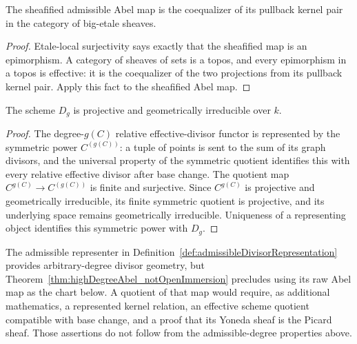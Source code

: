\begin{theorem}
  \label{thm:admissibleAbel_etaleCoequalizer}
  \leanok
  The sheafified admissible Abel map is the coequalizer of its pullback kernel pair in the
  category of big-etale sheaves.
\end{theorem}
\begin{proof}
  Etale-local surjectivity says exactly that the sheafified map is an epimorphism.  A category
  of sheaves of sets is a topos, and every epimorphism in a topos is effective: it is the
  coequalizer of the two projections from its pullback kernel pair.  Apply this fact to the
  sheafified Abel map.
\end{proof}

\begin{theorem}
  \label{thm:genusDivisorSource_geometry}
  \notready
  The scheme \(D_g\) is projective and geometrically irreducible over \(k\).
\end{theorem}
\begin{proof}
  The degree-\(g(C)\) relative effective-divisor functor is represented by the symmetric power
  \(C^{(g(C))}\): a tuple of points is sent to the sum of its graph divisors, and the universal
  property of the symmetric quotient identifies this with every relative effective divisor
  after base change.  The quotient map \(C^{g(C)}\to C^{(g(C))}\) is finite and surjective.
  Since \(C^{g(C)}\) is projective and geometrically irreducible, its finite symmetric quotient
  is projective, and its underlying space remains geometrically irreducible.  Uniqueness of a
  representing object identifies this symmetric power with \(D_g\).
\end{proof}

The admissible representer in Definition~\ref{def:admissibleDivisorRepresentation} provides
arbitrary-degree divisor geometry, but
Theorem~\ref{thm:highDegreeAbel_notOpenImmersion} precludes using its raw Abel map as the
chart below.  A quotient of that map would require, as additional mathematics, a represented
kernel relation, an effective scheme quotient compatible with base change, and a proof that
its Yoneda sheaf is the Picard sheaf.  Those assertions do not follow from the admissible-degree
properties above.

